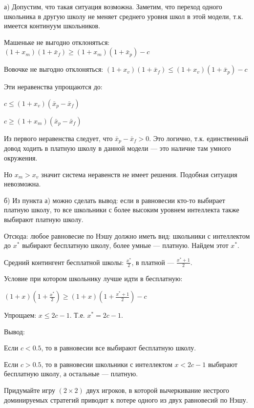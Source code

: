 \begin{problem}
\begin{sol}
а) Допустим, что такая ситуация возможна. Заметим, что переход одного школьника в другую школу не меняет среднего уровня школ в этой модели, т.к. имеется континуум школьников. \par
Машеньке не выгодно отклоняться: $(1+x_{m})(1+\bar{x}_{f})\ge (1+x_{m})(1+\bar{x}_{p})-c$ \par
Вовочке не выгодно отклоняться: $(1+x_{v})(1+\bar{x}_{f})\le (1+x_{v})(1+\bar{x}_{p})-c$ \par
Эти неравенства упрощаются до: \par
$c\le (1+x_{v})(\bar{x}_{p}-\bar{x}_{f})$ \par
$c\ge (1+x_{m})(\bar{x}_{p}-\bar{x}_{f})$ \par
Из первого неравенства следует, что $\bar{x}_{p}-\bar{x}_{f}>0$. Это логично, т.к. единственный довод ходить в платную школу в данной модели — это наличие там умного окружения. \par
Но $x_{m}>x_{v}$ значит система неравенств не имеет решения. Подобная ситуация невозможна. \par
б) Из пункта а) можно сделать вывод: если в равновесии кто-то выбирает платную школу, то все школьники с более высоким уровнем интеллекта также выбирают платную школу. \par
Отсюда: любое равновесие по Нэшу должно иметь вид: школьники с интеллектом до $x^{*}$ выбирают бесплатную школу, более умные — платную. Найдем этот $x^{*}$. \par
Средний контингент бесплатной школы: $\frac{x^{*}}{2}$, в платной — $\frac{x^{*}+1}{2}$. \par
Условие при котором школьнику лучше идти в бесплатную: \par
$(1+x)(1+\frac{x^{*}}{2})\ge (1+x)(1+\frac{x^{*}+1}{2})-c$ \par
Упрощаем: $x\le 2c-1$. Т.е. $x^{*}=2c-1$. \par
Вывод: \par
Если $c<0.5$, то в равновесии все выбирают бесплатную школу. \par
Если $c>0.5$, то в равновесии школьники с интеллектом $x<2c-1$ выбирают бесплатную школу, а остальные — платную.
\end{sol}
\end{problem}




\begin{problem}

Придумайте игру  $\left(2\times 2\right)$  двух игроков, в которой вычеркивание нестрого доминируемых стратегий приводит к потере одного из двух равновесий по Нэшу.



\begin{sol}

\end{sol}
\end{problem}




